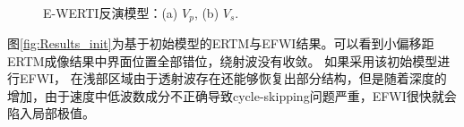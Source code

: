\begin{figure}[!htb]
   \centering
   \\
   \caption{E-WERTI反演模型：(a) $V_p$, (b) $V_s$.}
   \label{fig:InvertedModel_WERTI}
\end{figure}
图\ref{fig:Results_init}为基于初始模型的ERTM与EFWI结果。可以看到小偏移距ERTM成像结果中界面位置全部错位，绕射波没有收敛。
如果采用该初始模型进行EFWI，
在浅部区域由于透射波存在还能够恢复出部分结构，但是随着深度的增加，由于速度中低波数成分不正确导致cycle-skipping问题严重，EFWI很快就会
陷入局部极值。

